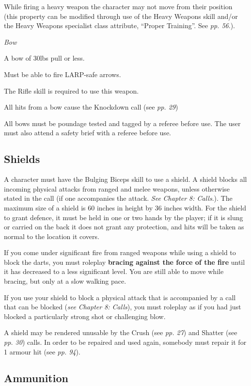 While firing a heavy weapon the character may not move from their position (this property can be modified through use of the Heavy Weapons skill and/or the Heavy Weapons specialist class attribute, ``Proper Training''. See \textit{pp. 56}.).

\textit{Bow}

A bow of 30lbs pull or less.

Must be able to fire LARP-safe arrows.

The Rifle skill is required to use this weapon.

All hits from a bow cause the Knockdown call (see \textit{pp. 29})

All bows must be poundage tested and tagged by a referee before use. The user must also attend a safety brief with a referee before use.

\subsection{Shields}

A character must have the Bulging Biceps skill to use a shield. A shield blocks all incoming physical attacks from ranged and melee weapons, unless otherwise stated in the call (if one accompanies the attack. \textit{See} \textit{Chapter 8: Calls}.). The maximum size of a shield is 60 inches in height by 36 inches width. For the shield to grant defence, it must be held in one or two hands by the player; if it is slung or carried on the back it does not grant any protection, and hits will be taken as normal to the location it covers.

If you come under significant fire from ranged weapons while using a shield to block the darts, you must roleplay \textbf{bracing against the force of the fire} until it has decreased to a less significant level. You are still able to move while bracing, but only at a slow walking pace.

If you use your shield to block a physical attack that is accompanied by a call that can be blocked (\textit{see} \textit{Chapter 8: Calls}), you must roleplay as if you had just blocked a particularly strong shot or challenging blow.

A shield may be rendered unusable by the Crush (see \textit{pp. 27}) and Shatter (see \textit{pp. 30}) calls. In order to be repaired and used again, somebody must repair it for 1 armour hit (see \textit{pp. 94}).

\subsection{Ammunition}

